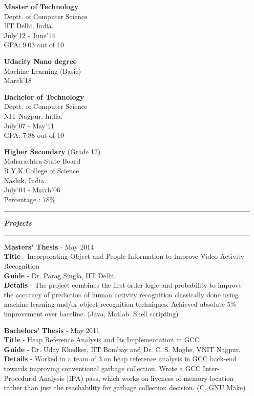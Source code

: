 \documentclass[10pt]{article}
\begin{document}
\parbox{130pt}{
	{\bf Master of Technology} \\
	Deptt. of Computer Science \\
	IIT Delhi, India. \\
	July'12 - June'14 \\
	GPA: 9.03 out of 10
}
\parbox{85pt}{
	{\bf Udacity Nano degree} \\
	Machine Learning (Basic) \\
	March'18
}
\parbox{130pt}{
	{\bf Bachelor of Technology} \\
	Deptt. of Computer Science \\
	NIT Nagpur, India. \\
	July'07 - May'11 \\
	GPA: 7.88 out of 10
}
\parbox{120pt}{
	{\bf Higher Secondary} (Grade 12) \\
	Maharashtra State Board \\
	R.Y.K College of Science \\
	Nashik, India. \\
	July'04 - March'06 \\
	Percentage : 78\%
}
\vspace{10pt}

\hrule \vspace{3pt}
{\Large \bfseries \slshape \sc Projects}
\vspace{3pt} \hrule \vspace{7pt}

\parbox{0.97\textwidth}{
{\bf Masters' Thesis} - May 2014 \\
{\bf Title} - Incorporating Object and People Information to Improve Video Activity Recognition \\
{\bf Guide} - Dr. Parag Singla, IIT Delhi.\\
{\bf Details} - The project combines the first order logic and probability to improve the accuracy of prediction of human activity recognition classically done using machine learning and/or object recognition techniques. Achieved absolute 5\% improvement over baseline. (Java, Matlab, Shell scripting)
}
\vspace{7pt}

\parbox{0.97\textwidth}{
{\bf Bachelors' Thesis} - May 2011 \\
{\bf Title} - Heap Reference Analysis and Its Implementation in GCC \\
{\bf Guide} - Dr. Uday Khedker, IIT Bombay and Dr. C. S. Moghe, VNIT Nagpur.\\
{\bf Details} - Worked in a team of 3 on heap reference analysis in GCC back-end towards improving conventional garbage collection. Wrote a GCC Inter-Procedural Analysis (IPA) pass, which works on liveness of memory location rather than just the reachability for garbage collection decision. (C, GNU Make)
}
\end{document}
